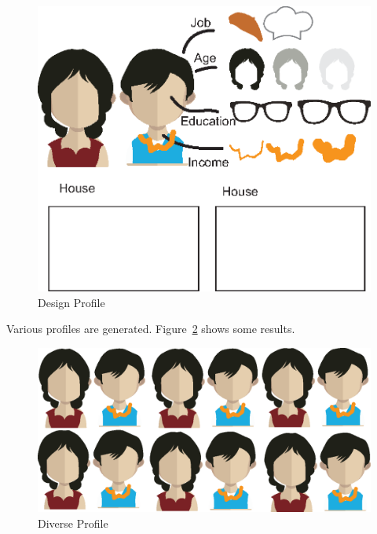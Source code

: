 \begin{figure}[htb!]
 \centering %
 \includegraphics[width=\columnwidth]{pictures/design_profile}
 \caption{Design Profile}
 \label{fig:design_profile}
\end{figure}

Various profiles are generated. Figure~\ref{fig:div_profile} shows some results.

\begin{figure}[htb!]
 \centering %
 \includegraphics[width=\columnwidth]{pictures/design_div}
 \caption{Diverse Profile}
 \label{fig:div_profile}
\end{figure}

